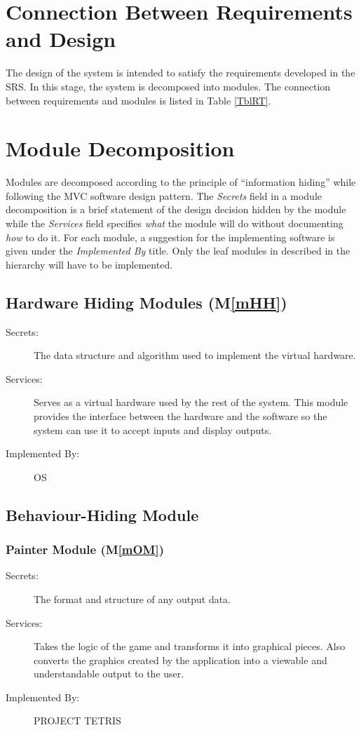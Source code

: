 \documentclass[12pt, titlepage]{article}
\newcommand{\mref}[1]{M\ref{#1}}
\begin{document}
\section{Connection Between Requirements and Design} \label{SecConnection}
The design of the system is intended to satisfy the requirements developed in
the SRS. In this stage, the system is decomposed into modules. The connection
between requirements and modules is listed in Table \ref{TblRT}.


\section{Module Decomposition} \label{SecMD}
Modules are decomposed according to the principle of ``information hiding'' while following
the MVC software design pattern. The \emph{Secrets} field in a module
decomposition is a brief statement of the design decision hidden by the
module while the \emph{Services} field specifies \emph{what} the module will do
without documenting \emph{how} to do it. For each module, a suggestion for the
implementing software is given under the \emph{Implemented By} title.
Only the leaf modules in described in the hierarchy will have to be implemented.
\subsection{Hardware Hiding Modules (\mref{mHH})}
\begin{description}
\item[Secrets:]The data structure and algorithm used to implement the virtual
  hardware.
\item[Services:]Serves as a virtual hardware used by the rest of the
  system. This module provides the interface between the hardware and the
  software so the system can use it to accept inputs and display outputs.
\item[Implemented By:] OS
\end{description}

\subsection{Behaviour-Hiding Module}
\subsubsection{Painter Module (\mref{mOM})}
\begin{description}
\item[Secrets:]The format and structure of any output data.
\item[Services:] Takes the logic of the game and transforms it into graphical pieces. Also converts the graphics created by the application 
into a viewable and understandable output to the user.
\item[Implemented By:] PROJECT TETRIS
\end{description}
\end{document}
